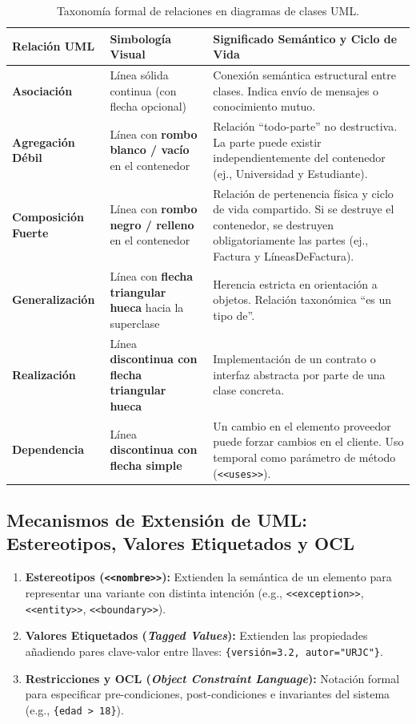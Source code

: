 \begin{table}[htbp]
\centering
\small
\begin{tabularx}{\textwidth}{l p{4.5cm} X}
\toprule
\textbf{Relación UML} & \textbf{Simbología Visual} & \textbf{Significado Semántico y Ciclo de Vida} \\
\midrule
\textbf{Asociación} & Línea sólida continua (con flecha opcional) & Conexión semántica estructural entre clases. Indica envío de mensajes o conocimiento mutuo. \\
\addlinespace
\textbf{Agregación Débil} & Línea con \textbf{rombo blanco / vacío} en el contenedor & Relación ``todo-parte'' no destructiva. La parte puede existir independientemente del contenedor (ej., Universidad y Estudiante). \\
\addlinespace
\textbf{Composición Fuerte} & Línea con \textbf{rombo negro / relleno} en el contenedor & Relación de pertenencia física y ciclo de vida compartido. Si se destruye el contenedor, se destruyen obligatoriamente las partes (ej., Factura y LíneasDeFactura). \\
\addlinespace
\textbf{Generalización} & Línea con \textbf{flecha triangular hueca} hacia la superclase & Herencia estricta en orientación a objetos. Relación taxonómica ``es un tipo de''. \\
\addlinespace
\textbf{Realización} & Línea \textbf{discontinua con flecha triangular hueca} & Implementación de un contrato o interfaz abstracta por parte de una clase concreta. \\
\addlinespace
\textbf{Dependencia} & Línea \textbf{discontinua con flecha simple} & Un cambio en el elemento proveedor puede forzar cambios en el cliente. Uso temporal como parámetro de método (\texttt{<<uses>>}). \\
\bottomrule
\end{tabularx}
\caption{Taxonomía formal de relaciones en diagramas de clases UML.}
\label{tab:relaciones-uml}
\end{table}

\subsection{Mecanismos de Extensión de UML: Estereotipos, Valores Etiquetados y OCL}

\begin{enumerate}[leftmargin=1.5em]
  \item \textbf{Estereotipos (\texttt{<<nombre>>}):} Extienden la semántica de un elemento para representar una variante con distinta intención (e.g., \texttt{<<exception>>}, \texttt{<<entity>>}, \texttt{<<boundary>>}).
  \item \textbf{Valores Etiquetados (\emph{Tagged Values}):} Extienden las propiedades añadiendo pares clave-valor entre llaves: \texttt{\{versión=3.2, autor="URJC"\}}.
  \item \textbf{Restricciones y OCL (\emph{Object Constraint Language}):} Notación formal para especificar pre-condiciones, post-condiciones e invariantes del sistema (e.g., \texttt{\{edad > 18\}}).
\end{enumerate}

